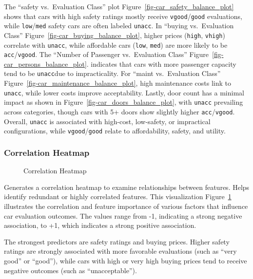 \documentclass[
  letterpaper,
  DIV=11,
  numbers=noendperiod]{scrartcl}
\begin{document}
The ``safety vs.~Evaluation Class'' plot
Figure~\ref{fig-car_safety_balance_plot} shows that cars with high
safety ratings mostly receive \texttt{vgood}/\texttt{good} evaluations,
while \texttt{low}/\texttt{med} safety cars are often labeled
\texttt{unacc}. In ``buying vs.~Evaluation Class''
Figure~\ref{fig-car_buying_balance_plot}, higher prices (\texttt{high},
\texttt{vhigh}) correlate with \texttt{unacc}, while affordable cars
(\texttt{low}, \texttt{med}) are more likely to be
\texttt{acc}/\texttt{vgood}. The ``Number of Passenger vs.~Evaluation
Class'' Figure~\ref{fig-car_persons_balance_plot}. indicates that cars
with more passenger capacity tend to be \texttt{unacc}due to
impracticality. For ``maint vs.~Evaluation Class''
Figure~\ref{fig-car_maintenance_balance_plot}, high maintenance costs
link to \texttt{unacc}, while lower costs improve acceptability. Lastly,
door count has a minimal impact as shown in
Figure~\ref{fig-car_doors_balance_plot}, with \texttt{unacc} prevailing
across categories, though cars with 5+ doors show slightly higher
\texttt{acc}/\texttt{vgood}. Overall, \texttt{unacc} is associated with
high-cost, low-safety, or impractical configurations, while
\texttt{vgood}/\texttt{good} relate to affordability, safety, and
utility.

\subsubsection{Correlation Heatmap}\label{correlation-heatmap}

\begin{figure}


\caption{\label{fig-corr_heatmap}Correlation Heatmap}

\end{figure}%

Generates a correlation heatmap to examine relationships between
features. Helps identify redundant or highly correlated features. This
visualization Figure~\ref{fig-corr_heatmap} illustrates the correlation
and feature importance of various factors that influence car evaluation
outcomes. The values range from -1, indicating a strong negative
association, to +1, which indicates a strong positive association.

The strongest predictors are safety ratings and buying prices. Higher
safety ratings are strongly associated with more favorable evaluations
(such as ``very good'' or ``good''), while cars with high or very high
buying prices tend to receive negative outcomes (such as
``unacceptable'').
\end{document}
